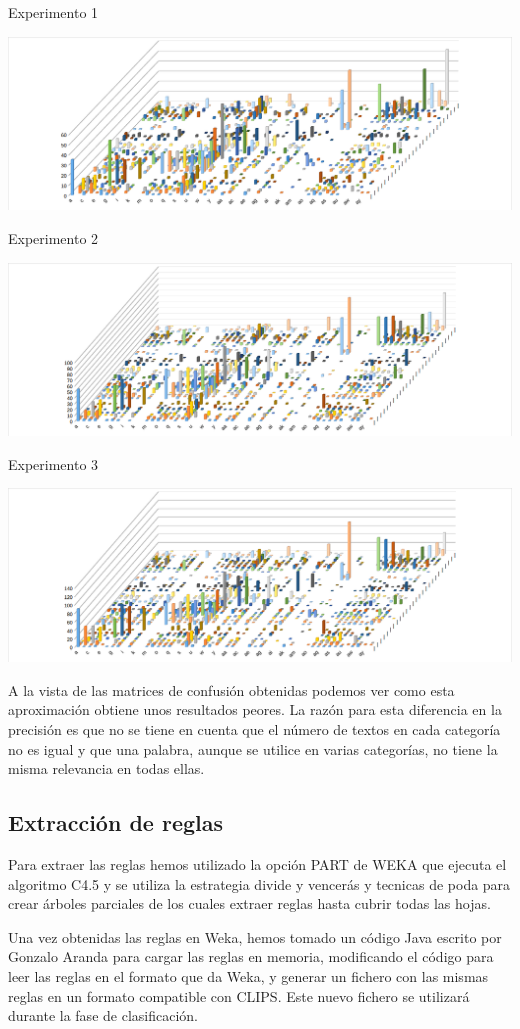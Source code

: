 Experimento 1
\begin{center}
\includegraphics[width=\textwidth]{j48/dataset80_bool.png} 
\end{center}
Experimento 2
\begin{center}
\includegraphics[width=\textwidth]{j48/dataset125_bool.png} 
\end{center}
Experimento 3
\begin{center}
\includegraphics[width=\textwidth]{j48/dataset175_bool.png} 
\end{center}

A la vista de las matrices de confusión obtenidas podemos ver como esta aproximación obtiene unos resultados peores. La razón para esta diferencia en la precisión es que no se tiene en cuenta que el número de textos en cada categoría  no es igual y que una palabra, aunque se utilice en varias categorías, no tiene la misma relevancia en todas ellas.

\subsection{Extracción de reglas}

Para extraer las reglas hemos utilizado la opción PART de WEKA que ejecuta el  algoritmo C4.5 y se utiliza la estrategia divide y vencerás y tecnicas de poda para crear árboles parciales de los cuales extraer reglas hasta cubrir todas las hojas.\cite{A1}\cite{M1}

Una vez obtenidas las reglas en Weka, hemos tomado un código Java escrito por Gonzalo Aranda para cargar las reglas en memoria, modificando el código para leer las reglas en el formato que da Weka, y generar un fichero con las mismas reglas en un formato compatible con CLIPS. Este nuevo fichero se utilizará durante la fase de clasificación.
 
